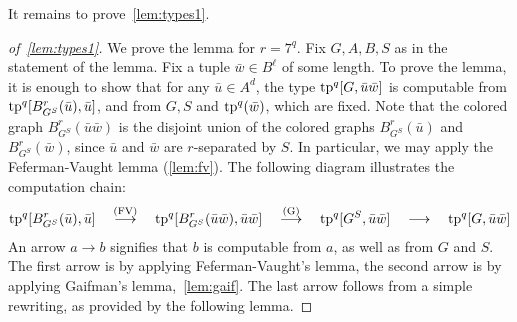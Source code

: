 It remains to prove~\cref{lem:types1}.




\begin{proof}[of~\cref{lem:types1}]
We prove the lemma for $r=7^q$. 
Fix $G,A,B,S$  as in the statement of the lemma.
Fix a tuple $\bar w\in B^\ell$ of some length.
To prove the lemma, it is enough to show that
for any   $\bar u\in A^d$,
the type
$\mathrm{tp}^q[G,\bar u\bar w]$ is computable from $\mathrm{tp}^q[B^r_{G^S}(\bar u), \bar u]$,
and from 
$G,S$ and $\mathrm{tp}^q(\bar w)$, which are fixed.
Note that the colored graph $B^r_{G^S}(\bar u\bar w)$
is the disjoint union of the colored graphs 
$B^r_{G^S}(\bar u)$ and $B^r_{G^S}(\bar w)$,
since $\bar u$ and $\bar w$ are $r$-separated by $S$.
In particular, we may apply the Feferman-Vaught lemma (\cref{lem:fv}).
The following diagram illustrates the computation chain:
\begin{align*}
	\mathrm{tp}^q[B^r_{G^S}(\bar u), \bar u]
  \quad\stackrel{\textrm{(FV)}}{\longrightarrow}\quad
	\mathrm{tp}^q[B^r_{G^S}(\bar u\bar w), \bar u\bar w] \quad\stackrel{\textrm{(G)}}\longrightarrow\quad
	\mathrm{tp}^q[G^S, \bar u\bar w] \quad\longrightarrow\quad
	\mathrm{tp}^q[G, \bar u\bar w]
\end{align*}
An arrow $a\longrightarrow b$ signifies that $b$ is computable from $a$, as well as from $G$ and $S$.
The first arrow is by applying Feferman-Vaught's lemma, the second arrow is by applying Gaifman's lemma,~\cref{lem:gaif}.
The last arrow follows from a simple rewriting, as provided by the following lemma.


\end{proof}
